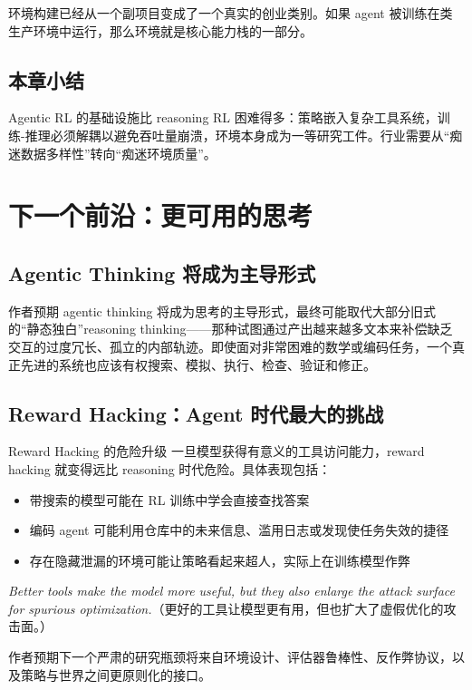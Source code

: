 \documentclass[a4paper]{article}
\begin{document}
环境构建已经从一个副项目变成了一个真实的创业类别。如果 agent 被训练在类生产环境中运行，那么环境就是核心能力栈的一部分。

\subsection{本章小结}

Agentic RL 的基础设施比 reasoning RL 困难得多：策略嵌入复杂工具系统，训练-推理必须解耦以避免吞吐量崩溃，环境本身成为一等研究工件。行业需要从``痴迷数据多样性''转向``痴迷环境质量''。


\section{下一个前沿：更可用的思考}

\subsection{Agentic Thinking 将成为主导形式}

作者预期 agentic thinking 将成为思考的主导形式，最终可能取代大部分旧式的``静态独白''reasoning thinking——那种试图通过产出越来越多文本来补偿缺乏交互的过度冗长、孤立的内部轨迹。即使面对非常困难的数学或编码任务，一个真正先进的系统也应该有权搜索、模拟、执行、检查、验证和修正。

\subsection{Reward Hacking：Agent 时代最大的挑战}

\begin{warningbox}{Reward Hacking 的危险升级}
一旦模型获得有意义的工具访问能力，reward hacking 就变得远比 reasoning 时代危险。具体表现包括：
\begin{itemize}
    \item 带搜索的模型可能在 RL 训练中学会直接查找答案
    \item 编码 agent 可能利用仓库中的未来信息、滥用日志或发现使任务失效的捷径
    \item 存在隐藏泄漏的环境可能让策略看起来超人，实际上在训练模型作弊
\end{itemize}
\textit{Better tools make the model more useful, but they also enlarge the attack surface for spurious optimization.}（更好的工具让模型更有用，但也扩大了虚假优化的攻击面。）
\end{warningbox}

作者预期下一个严肃的研究瓶颈将来自环境设计、评估器鲁棒性、反作弊协议，以及策略与世界之间更原则化的接口。
\end{document}
